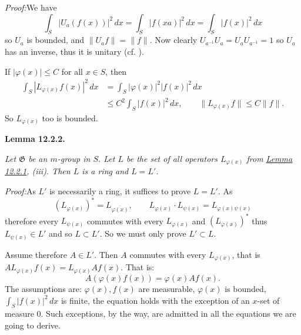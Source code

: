 \documentclass[12pt,b5paper,twoside]{article}
\newcommand{\Lemma}[1]{%
  \par\smallskip\noindent\phantomsection\label{lem:#1}\textbf{Lemma #1.}\enspace
}
\newcommand{\Proof}{\par\noindent\textit{Proof:}\enspace}
\newcommand{\lemref}[1]{\hyperref[lem:#1]{Lemma #1}}
\begin{document}
\Proof We have
\[
 \int_S|U_a(f(x))|^2\,dx=\int_S|f(xa)|^2\,dx
 =\int_S|f(x)|^2\,dx
\]
so $U_a$ is bounded, and $\lVert U_af\rVert=\lVert f\rVert$. Now clearly
$U_{a^{-1}}U_a=U_aU_{a^{-1}}=1$ so $U_a$ has an inverse, thus it is unitary
(cf. \cite[p.~71]{ref16}).

If $|\varphi(x)|\leq C$ for all $x\in S$, then
\begin{align*}
 \int_S|L_{\varphi(x)}f(x)|^2\,dx
 &=\int_S|\varphi(x)|^2|f(x)|^2\,dx\\
 &\leq C^2\int_S|f(x)|^2\,dx,
 \qquad \lVert L_{\varphi(x)}f\rVert\leq C\lVert f\rVert.
\end{align*}
So $L_{\varphi(x)}$ too is bounded.

\Lemma{12.2.2}
\emph{Let $\mathfrak G$ be an $m$-group in $S$. Let $L$ be the set of all
operators $L_{\varphi(x)}$ from \lemref{12.2.1}, (iii). Then $L$ is a ring and
$L=L'$.}

\Proof As $L'$ is necessarily a ring, it suffices to prove $L=L'$. As
\[
 (L_{\varphi(x)})^*=L_{\overline{\varphi(x)}},
 \qquad
 L_{\varphi(x)}\mathbin{\cdot}L_{\psi(x)}=L_{\varphi(x)\psi(x)}
\]
therefore every $L_{\psi(x)}$ commutes with every $L_{\varphi(x)}$ and
$(L_{\varphi(x)})^*$ thus $L_{\psi(x)}\in L'$ and so $L\subset L'$. So we
must only prove $L'\subset L$.

Assume therefore $A\in L'$. Then $A$ commutes with every $L_{\varphi(x)}$,
that is $AL_{\varphi(x)}f(x)=L_{\varphi(x)}Af(x)$. That is:
\begin{equation*}
 A(\varphi(x)f(x))=\varphi(x)Af(x).
 \tag{$*$}\label{eq:12.2-star}
\end{equation*}
The assumptions are: $\varphi(x),f(x)$ are measurable, $\varphi(x)$ is
bounded, $\int_S|f(x)|^2\,dx$ is finite, the equation holds with the exception
of an $x$-set of measure $0$. Such exceptions, by the way, are admitted in all
the equations we are going to derive.
\end{document}
